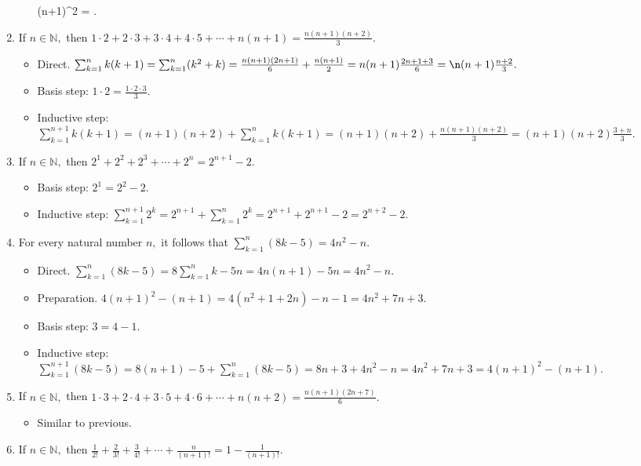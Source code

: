 \documentclass[11pt, oneside]{amsart}
\begin{document}
\begin{enumerate}
\begin{itemize}
      (n+1)^2  = .\)
\end{itemize}
\item If \(n \in \mathbb{N},\) then \(1\cdot 2 + 2\cdot 3 + 3\cdot 4 + 4\cdot 5 + \dotsb + n(n+1) = \frac{n(n+1)(n+2)}{3}.\)
\label{sec:orgfdcdb68}
\begin{itemize}
\item Direct. \(\sum_{k=1}^n k(k+1) = \sum_{k=1}^n (k^2 + k) = \frac{n(n+1)(2n+1)}{6} + \frac{n(n+1)}{2} =
      n(n+1)\frac{2n+1+3}{6} = \n(n+1)\frac{n+2}{3}.\)
\item Basis step: \(1\cdot 2 = \frac{1 \cdot 2 \cdot 3}{3}.\)
\item Inductive step: \(\sum_{k=1}^{n+1} k(k+1) = (n+1)(n+2) + \sum_{k=1}^n k(k+1) = (n+1)(n+2) +
      \frac{n(n+1)(n+2)}{3} = (n+1)(n+2) \frac{ 3 + n }{3}.\)
\end{itemize}
\item If \(n \in \mathbb{N},\) then \(2^1 + 2^2 + 2^3 + \dotsb + 2^n = 2^{n+1}-2.\)
\label{sec:org67f2ba8}
\begin{itemize}
\item Basis step: \(2^1 = 2^2-2.\)
\item Inductive step: \(\sum_{k=1}^{n+1} 2^k = 2^{n+1} + \sum_{k=1}^n 2^k = 2^{n+1} + 2^{n+1}-2 =
      2^{n+2} - 2.\)
\end{itemize}
\item For every natural number \(n,\) it follows that \(\sum_{k=1}^n (8k-5) = 4n^2-n.\)
\label{sec:org5f78cb0}
\begin{itemize}
\item Direct. \(\sum_{k=1}^n (8k-5) = 8\sum_{k=1}^n k - 5n = 4n(n+1) - 5n = 4n^2 -n.\)
\item Preparation. \(4(n+1)^2-(n+1) = 4(n^2+1+2n)-n-1 = 4n^2+7n+3.\)
\item Basis step: \(3 = 4-1.\)
\item Inductive step: \(\sum_{k=1}^{n+1} (8k-5) = 8(n+1)-5 + \sum_{k=1}^n (8k-5) = 8n+3 + 4n^2-n =
      4n^2+7n+3 = 4(n+1)^2-(n+1).\)
\end{itemize}
\item If \(n \in \mathbb{N},\) then \(1\cdot 3 + 2\cdot 4 + 3\cdot 5 + 4\cdot 6 + \dotsb + n(n+2) = \frac{n(n+1)(2n+7)}{6}.\)
\label{sec:org9c92794}
\begin{itemize}
\item Similar to previous.
\end{itemize}
\item If \(n \in \mathbb{N},\) then \(\frac{1}{2!} + \frac{2}{3!} + \frac{3}{4!} + \dotsb + \frac{n}{(n+1)!} = 1 - \frac{1}{(n+1)!}.\)

\end{enumerate}
\end{document}
